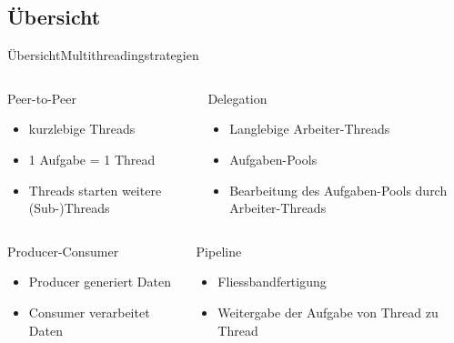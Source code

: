 \documentclass{beamer}
\begin{document}
\subsection{\"Ubersicht}
\begin{frame}{\"Ubersicht}{Multithreadingstrategien}

\begin{columns}
        \begin{block}{Peer-to-Peer}
        \begin{itemize}
            \item kurzlebige Threads
            \item 1 Aufgabe = 1 Thread
            \item Threads starten weitere (Sub-)Threads
        \end{itemize}
        \end{block}
        \begin{block}{Delegation}
        \begin{itemize}
            \item Langlebige Arbeiter-Threads
            \item Aufgaben-Pools
            \item Bearbeitung des Aufgaben-Pools durch Arbeiter-Threads
        \end{itemize}
        \end{block}
    
\end{columns}

\begin{columns}
        \begin{block}{Producer-Consumer}
        \begin{itemize}
            \item Producer generiert Daten
            \item Consumer verarbeitet Daten
        \end{itemize}
        \end{block}
        \begin{block}{Pipeline}
        \begin{itemize}
            \item Fliessbandfertigung
            \item Weitergabe der Aufgabe von Thread zu Thread
        \end{itemize}
        \end{block}
    
\end{columns}
\end{frame}
\end{document}
